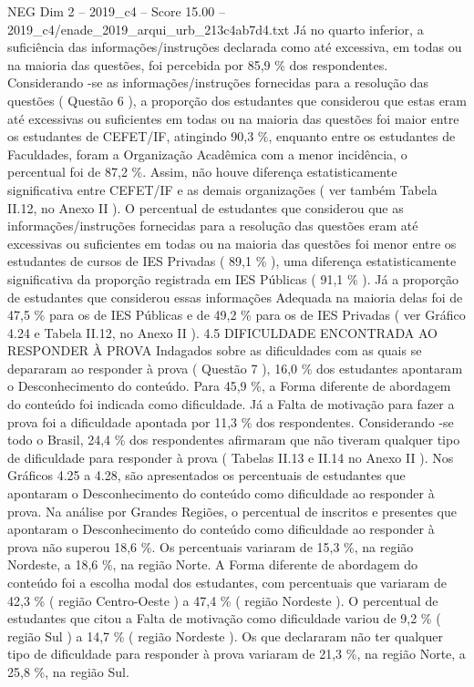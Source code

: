 \begin{textsample}{NEG Dim 2 – 2019\_c4 – Score 15.00 – 2019\_c4/enade\_2019\_arqui\_urb\_213c4ab7d4.txt}
Já no quarto inferior, a suficiência das informações/instruções declarada como até excessiva, em todas ou na maioria das questões, foi percebida por 85,9 \% dos respondentes.
Considerando -se as informações/instruções fornecidas para a resolução das questões ( Questão 6 ), a proporção dos estudantes que considerou que estas eram até excessivas ou suficientes em todas ou na maioria das questões foi maior entre os estudantes de CEFET/IF, atingindo 90,3 \%, enquanto entre os estudantes de Faculdades, foram a Organização Acadêmica com a menor incidência, o percentual foi de 87,2 \%.
Assim, não houve diferença estatisticamente significativa entre CEFET/IF e as demais organizações ( ver também Tabela II.12, no Anexo II ).
O percentual de estudantes que considerou que as informações/instruções fornecidas para a resolução das questões eram até excessivas ou suficientes em todas ou na maioria das questões foi menor entre os estudantes de cursos de IES Privadas ( 89,1 \% ), uma diferença estatisticamente significativa da proporção registrada em IES Públicas ( 91,1 \% ).
Já a proporção de estudantes que considerou essas informações Adequada na maioria delas foi de 47,5 \% para os de IES Públicas e de 49,2 \% para os de IES Privadas ( ver Gráfico 4.24 e Tabela II.12, no Anexo II ). 4.5 DIFICULDADE ENCONTRADA AO RESPONDER À PROVA Indagados sobre as dificuldades com as quais se depararam ao responder à prova ( Questão 7 ), 16,0 \% dos estudantes apontaram o Desconhecimento do conteúdo.
Para 45,9 \%, a Forma diferente de abordagem do conteúdo foi indicada como dificuldade.
Já a Falta de motivação para fazer a prova foi a dificuldade apontada por 11,3 \% dos respondentes.
Considerando -se todo o Brasil, 24,4 \% dos respondentes afirmaram que não tiveram qualquer tipo de dificuldade para responder à prova ( Tabelas II.13 e II.14 no Anexo II ).
Nos Gráficos 4.25 a 4.28, são apresentados os percentuais de estudantes que apontaram o Desconhecimento do conteúdo como dificuldade ao responder à prova.
Na análise por Grandes Regiões, o percentual de inscritos e presentes que apontaram o Desconhecimento do conteúdo como dificuldade ao responder à prova não superou 18,6 \%.
Os percentuais variaram de 15,3 \%, na região Nordeste, a 18,6 \%, na região Norte.
A Forma diferente de abordagem do conteúdo foi a escolha modal dos estudantes, com percentuais que variaram de 42,3 \% ( região Centro-Oeste ) a 47,4 \% ( região Nordeste ).
O percentual de estudantes que citou a Falta de motivação como dificuldade variou de 9,2 \% ( região Sul ) a 14,7 \% ( região Nordeste ).
Os que declararam não ter qualquer tipo de dificuldade para responder à prova variaram de 21,3 \%, na região Norte, a 25,8 \%, na região Sul.

\end{textsample}
